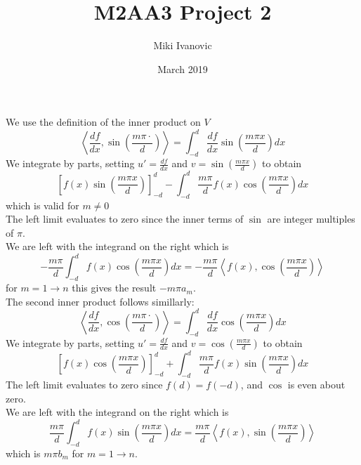 \documentclass[12pt]{article}
\title{M2AA3 Project 2}
\author{Miki Ivanovic}
\date{March 2019}
\begin{document}
\maketitle

\section{}

We use the definition of the inner product on $V$
$$\left\langle
\frac{df}{dx}
,
\sin{\left(\frac{m \pi \cdot}{d}\right)}
\right\rangle
=
\int_{-d}^{d}
\frac{df}{dx}
\sin\left(\frac{m \pi x}{d}\right)
dx$$
We integrate by parts, setting $u' = \frac{df}{dx}$ and $v = \sin\left(\frac{m\pi x}{d}\right)$ to obtain
$$
\left[
f(x)
\sin{\left(
\frac{m \pi x}{d}
\right)}
\right]_{-d}^{d}
-
\int_{-d}^{d}
\frac{m\pi}{d}
f(x)
\cos\left(\frac{m\pi x}{d}\right)
dx
$$
which is valid for $m \ne 0$
\\The left limit evaluates to zero since the inner terms of $\sin$
are integer multiples of $\pi$.
\\We are left with the integrand on the right which is 
$$
-\frac{m\pi}{d}
\int_{-d}^{d}f(x)\cos\left(\frac{m\pi x}{d}\right)dx
=
-\frac{m\pi}{d}
\left\langle
f(x),\cos\left(\frac{m\pi x}{d}\right)
\right\rangle
$$
for $m = 1 \rightarrow n$ this gives the result $-m\pi a_m$.
\\
The second inner product follows simillarly:
$$\left\langle
\frac{df}{dx}
,
\cos{\left(\frac{m \pi \cdot}{d}\right)}
\right\rangle
=
\int_{-d}^{d}
\frac{df}{dx}
\cos\left(\frac{m \pi x}{d}\right)
dx$$
We integrate by parts, setting $u' = \frac{df}{dx}$ and $v = \cos\left(\frac{m\pi x}{d}\right)$ to obtain
$$
\left[
f(x)
\cos{\left(
\frac{m \pi x}{d}
\right)}
\right]_{-d}^{d}
+
\int_{-d}^{d}
\frac{m\pi}{d}
f(x)
\sin\left(\frac{m\pi x}{d}\right)
dx
$$
The left limit evaluates to zero since $f(d)=f(-d)$, and $\cos$ is even about zero.
\\We are left with the integrand on the right which is 
$$
\frac{m\pi}{d}
\int_{-d}^{d}f(x)\sin\left(\frac{m\pi x}{d}\right)dx
=
\frac{m\pi}{d}
\left\langle
f(x),\sin\left(\frac{m\pi x}{d}\right)
\right\rangle
$$
which is $m\pi b_m$ for $m=1 \rightarrow n$.

\section{}
\end{document}
